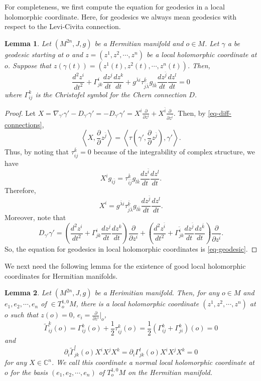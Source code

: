 \documentclass[12pt]{amsart}
\def\ol{\overline}
\def\bk{{\bar k}}
\def\p{\partial}
\newcommand\C{{\mathbb C}}
\def\ol{\overline}
\def\vv<#1,#2>{\left\langle#1,#2\right\rangle}
\newtheorem{lem}{Lemma}[section]
\theoremstyle{definition}
\theoremstyle{remark}
\numberwithin{equation}{section}
\def\bi{{\bar i}}
\def\bj{{\bar j}}
\begin{document}
For completeness, we first compute the equation for geodesics in a local holomorphic coordinate. Here, for geodesics we always mean geodesics with respect to the Levi-Civita connection.
\begin{lem}
Let $(M^{2n},J,g)$ be a Hermitian manifold and $o\in M$. Let $\gamma$ a be geodesic starting at $o$ and $z=(z^1,z^2,\cdots,z^n)$ be a local holomorphic coordinate at $o$. Suppose that $z(\gamma(t))=(z^1(t),z^2(t),\cdots,z^n(t))$. Then,
\begin{equation}\label{eq-geodesic}
\frac{d^2z^i}{dt^2}+\Gamma_{jk}^i\frac{dz^j}{dt}\frac{dz^k}{dt}+g^{\bar \lambda i}\tau_{\bar j\bar\lambda}^\bk g_{l\bk}\frac{dz^{\bar j}}{dt}\frac{dz^l}{dt}=0
\end{equation}
where $\Gamma_{ij}^k$ is the Christofel symbol for the Chern connection $D$.
\end{lem}
\begin{proof}
Let $X=\nabla_{\gamma'}\gamma'-D_{\gamma'}\gamma'=-D_{\gamma'}\gamma'=X^i\frac{\p}{\p z^i}+X^\bi\frac{\p}{\p z^\bi}$. Then, by \eqref{eq-diff-connections},
\begin{equation}
\vv<X,\frac{\p}{\p z^\bj}>=\vv<\tau\left(\gamma',\frac{\p}{\p z^\bj}\right),\gamma'>.
\end{equation}
Thus, by noting that $\tau_{ij}^\bk=0$ because of the integrability of complex structure, we have
\begin{equation}
X^ig_{i\bj}=\tau_{\bi\bj}^\bk g_{l\bk}\frac{dz^\bi}{dt}\frac{dz^l}{dt}.
\end{equation}
Therefore,
\begin{equation}
X^i=g^{\bar \lambda i}\tau_{\bar j\bar\lambda}^\bk g_{l\bk}\frac{dz^{\bar j}}{dt}\frac{dz^l}{dt}.
\end{equation}
Moreover, note that
\begin{equation}
D_{\gamma'}\gamma'=\left(\frac{d^2z^i}{dt^2}+\Gamma_{jk}^i\frac{dz^j}{dt}\frac{dz^k}{dt}\right)\frac{\p}{\p z^i}+\left(\frac{d^2z^\bi}{dt^2}+\ol{\Gamma_{jk}^i}\frac{dz^\bj}{dt}\frac{dz^\bk}{dt}\right)\frac{\p}{\p z^\bi}.
\end{equation}
So, the equation for geodesics in local holomorphic coordinates is \eqref{eq-geodesic}.
\end{proof}
We next need the following lemma for the existence of good local holomorphic coordinates for Hermitian manifolds.
\begin{lem}
Let $(M^{2n},J,g)$ be a Herimitian manifold. Then, for any $o\in M$ and  $e_1,e_2,\cdots,e_n$ of $\in T^{1,0}_oM$, there is a local holomorphic coordinate $(z^1,z^2,\cdots,z^n)$ at $o$ such that $z(o)=0$, $e_i=\frac{\p}{\p z^i}\big|_o$,
$$\tilde \Gamma_{ij}^k(o)=\Gamma_{ij}^k(o)+\frac{1}{2}\tau_{ij}^k(o)=\frac12\left({\Gamma_{ij}^k+\Gamma_{ji}^k}\right)(o)=0$$
and
$$\p_i\tilde\Gamma_{jk}^l(o)X^iX^jX^k=\p_i\Gamma_{jk}^l(o)X^iX^jX^k=0$$
for any $X\in \C^n$.  We call this coordinate a normal local holomorphic coordinate at $o$ for the basis $(e_1,e_2,\cdots,e_n)$ of $T^{1,0}_oM$ on the Hermitian manifold.
\end{lem}
\end{document}
